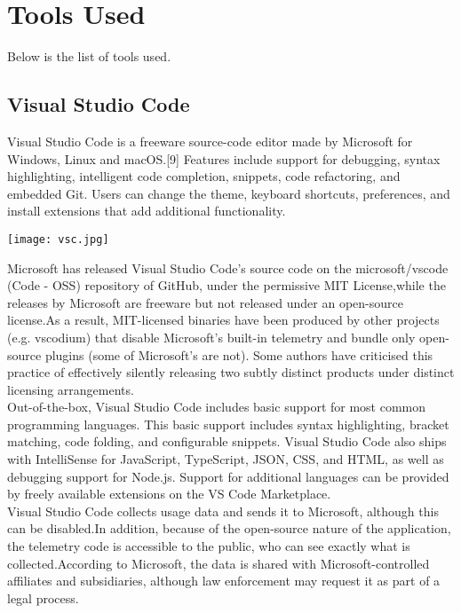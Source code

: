 \documentclass[12pt,a4paper]{report}
\begin{document}
\newpage
\section{Tools Used}
Below is the list of tools used.
\subsection{Visual Studio Code}
Visual Studio Code is a freeware source-code editor made by Microsoft for Windows, Linux and macOS.[9] Features include support for debugging, syntax highlighting, intelligent code completion, snippets, code refactoring, and embedded Git. Users can change the theme, keyboard shortcuts, preferences, and install extensions that add additional functionality.
\begin{center}
\texttt{[image: vsc.jpg]}
\begin{figure}[h!]
 \caption{}
\end{figure}
\end{center}







Microsoft has released Visual Studio Code's source code on the microsoft/vscode (Code - OSS) repository of GitHub, under the permissive MIT License,while the releases by Microsoft are freeware but not released under an open-source license.As a result, MIT-licensed binaries have been produced by other projects (e.g. vscodium) that disable Microsoft's built-in telemetry and bundle only open-source plugins (some of Microsoft's are not). Some authors have criticised this practice of effectively silently releasing two subtly distinct products under distinct licensing arrangements.\\
Out-of-the-box, Visual Studio Code includes basic support for most common programming languages. This basic support includes syntax highlighting, bracket matching, code folding, and configurable snippets. Visual Studio Code also ships with IntelliSense for JavaScript, TypeScript, JSON, CSS, and HTML, as well as debugging support for Node.js. Support for additional languages can be provided by freely available extensions on the VS Code Marketplace.\\
Visual Studio Code collects usage data and sends it to Microsoft, although this can be disabled.In addition, because of the open-source nature of the application, the telemetry code is accessible to the public, who can see exactly what is collected.According to Microsoft, the data is shared with Microsoft-controlled affiliates and subsidiaries, although law enforcement may request it as part of a legal process.\\\\
\end{document}
